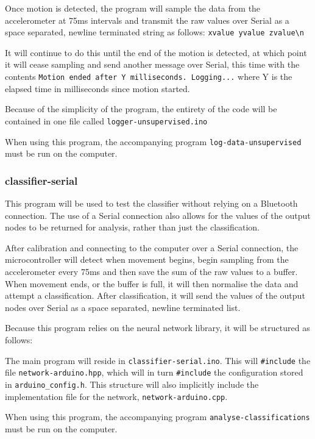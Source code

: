 \documentclass[a4paper]{article}
\begin{document}
Once motion is detected, the program will sample the data from the accelerometer at 75ms intervals and transmit the raw values over Serial as a space separated, newline terminated string as follows:
\lstinline|xvalue yvalue zvalue\n|

It will continue to do this until the end of the motion is detected, at which point it will cease sampling and send another message over Serial, this time with the contents \lstinline{Motion ended after Y milliseconds. Logging...} where Y is the elapsed time in milliseconds since motion started.

Because of the simplicity of the program, the entirety of the code will be contained in one file called \lstinline{logger-unsupervised.ino}

When using this program, the accompanying program \lstinline{log-data-unsupervised} must be run on the computer. 

\subsubsection{classifier-serial}

This program will be used to test the classifier without relying on a Bluetooth connection. The use of a Serial connection also allows for the values of the output nodes to be returned for analysis, rather than just the classification.

After calibration and connecting to the computer over a Serial connection, the microcontroller will detect when movement begins, begin sampling from the accelerometer every 75ms and then save the sum of the raw values to a buffer. When movement ends, or the buffer is full, it will then normalise the data and attempt a classification. After classification, it will send the values of the output nodes over Serial as a space separated, newline terminated list.

Because this program relies on the neural network library, it will be structured as follows:

The main program will reside in \lstinline{classifier-serial.ino}. This will \lstinline{#include} the file \lstinline{network-arduino.hpp}, which will in turn \lstinline{#include} the configuration stored in \lstinline{arduino_config.h}. 
This structure will also implicitly include the implementation file for the network, \lstinline{network-arduino.cpp}.


When using this program, the accompanying program \lstinline{analyse-classifications} must be run on the computer. 
\end{document}
